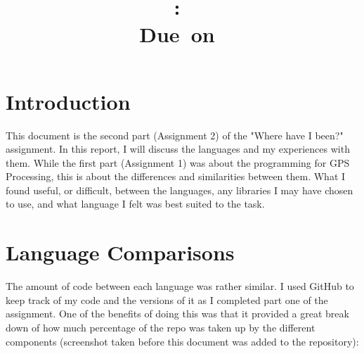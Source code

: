 \documentclass{article}
\title{
\vspace{2in}
\textmd{\textbf{\hmwkClass:\ \hmwkTitle}}\\
\normalsize\vspace{0.1in}\small{Due\ on\ \hmwkDueDate}\\
\vspace{3in}
}
\author{\textbf{\hmwkAuthorName}}
\date{} %
\begin{document}
\maketitle



\newpage
\tableofcontents
\newpage



\section{Introduction}
This document is the second part (Assignment 2\cite{assignment}) of the "Where have I been?" assignment. In this report, I will discuss the languages and my experiences with them. While the first part (Assignment 1) was about the programming for GPS Processing, this is about the differences and similarities between them. What I found useful, or difficult, between the languages, any libraries I may have chosen to use, and what language I felt was best suited to the task.



\section{Language Comparisons}

The amount of code between each language was rather similar. I used GitHub to keep track of my code and the versions of it as I completed part one of the assignment. One of the benefits of doing this was that it provided a great break down of how much percentage of the repo was taken up by the different components (screenshot taken before this document was added to the repository):
\end{document}
